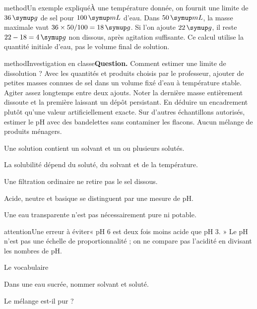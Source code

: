 \begin{pcEncadre}{method}{Un exemple expliqué}À une température donnée, on fournit une limite de $36\unite g$ de sel pour $100\unite{mL}$ d’eau. Dans $50\unite{mL}$, la masse maximale vaut $36\times50/100=18\unite g$. Si l’on ajoute $22\unite g$, il reste $22-18=4\unite g$ non dissous, après agitation suffisante. Ce calcul utilise la quantité initiale d’eau, pas le volume final de solution.\end{pcEncadre}
\label{activite-4}
\begin{pcEncadre}{method}{Investigation en classe}\textbf{Question.} Comment estimer une limite de dissolution ? Avec les quantités et produits choisis par le professeur, ajouter de petites masses connues de sel dans un volume fixé d’eau à température stable. Agiter assez longtemps entre deux ajouts. Noter la dernière masse entièrement dissoute et la première laissant un dépôt persistant. En déduire un encadrement plutôt qu’une valeur artificiellement exacte. Sur d’autres échantillons autorisés, estimer le pH avec des bandelettes sans contaminer les flacons. Aucun mélange de produits ménagers.\end{pcEncadre}
\begin{questions}
\item Une solution contient un solvant et un ou plusieurs solutés.
\item La solubilité dépend du soluté, du solvant et de la température.
\item Une filtration ordinaire ne retire pas le sel dissous.
\item Acide, neutre et basique se distinguent par une mesure de pH.
\item Une eau transparente n’est pas nécessairement pure ni potable.
\end{questions}
\begin{pcEncadre}{attention}{Une erreur à éviter}« pH 6 est deux fois moins acide que pH 3. » Le pH n’est pas une échelle de proportionnalité ; on ne compare pas l’acidité en divisant les nombres de pH.\end{pcEncadre}
\pcGrille
\clearpage{}
\par\noindent\begin{minipage}{\linewidth}
\begin{exercice}[1]{Le vocabulaire}
\begin{questions}
\item Dans une eau sucrée, nommer solvant et soluté.
\item Le mélange est-il pur ?
\end{questions}
\end{exercice}
\end{minipage}

